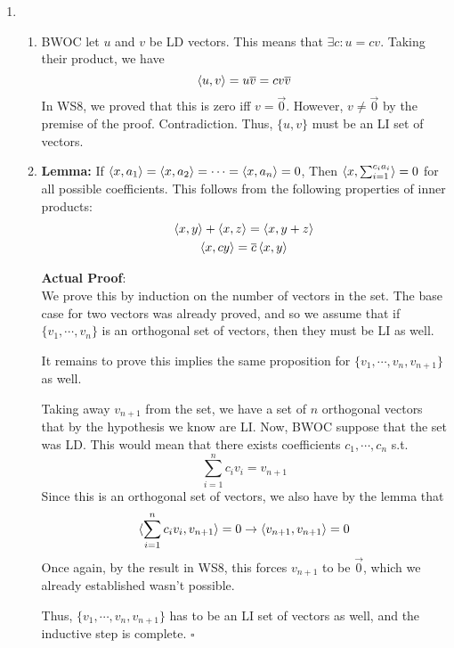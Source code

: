 \documentclass[12pt]{article}
\begin{document}
\begin{enumerate}
            \pagebreak

      \item \begin{enumerate}
                  \item BWOC let $u$ and $v$ be LD vectors.
                        This means that $\exists c: u=cv$.
                        Taking their product, we have
                        \[\braket{u, v} = u\overline{v} = cv\overline{v}\]
                        In WS8, we proved that this is zero iff $v=\vec{0}$.
                        However, $v \ne \vec{0}$ by the premise of the proof.
                        Contradiction.
                        Thus, $\{u, v\}$ must be an LI set of vectors.
                  \item \textbf{Lemma:} If $\braket{x, a_1}=\braket{x, a_2}=\cdots =\braket{x, a_n}=0$,
                        Then $\braket{x, \sum_{i=1}^{c_i a_i}}=0$ for all possible coefficients.
                        This follows from the following properties of inner products:
                        \begin{gather*}
                              \braket{x, y}+\braket{x, z}=\braket{x,y+z} \\
                              \braket{x, cy}=\overline{c}\braket{x, y}
                        \end{gather*}

                        \textbf{Actual Proof}: \\
                        We prove this by induction on the number of vectors in the set.
                        The base case for two vectors was already proved, and so we assume
                        that if $\{v_1, \cdots, v_n\}$ is an orthogonal set of vectors, then they must be LI as well.

                        It remains to prove this implies the same proposition
                        for $\{v_1, \cdots, v_n, v_{n+1}\}$ as well.

                        Taking away $v_{n+1}$ from the set, we have a set of $n$ orthogonal vectors
                        that by the hypothesis we know are LI.
                        Now, BWOC suppose that the set was LD.
                        This would mean that there exists coefficients $c_1, \cdots, c_n$ s.t.
                        \[\sum_{i=1}^{n} c_i v_i = v_{n+1}\]
                        Since this is an orthogonal set of vectors, we also have by the lemma that
                        \[\braket{\sum_{i=1}^{n} c_i v_i, v_{n+1}}=0 \rightarrow \braket{v_{n+1}, v_{n+1}}=0\]
                        Once again, by the result in WS8, this forces $v_{n+1}$ to be $\vec{0}$,
                        which we already established wasn't possible.

                        Thus, $\{v_1, \cdots, v_n, v_{n+1}\}$ has to be an LI set of vectors as well,
                        and the inductive step is complete. $\square$
            \end{enumerate}
\end{enumerate}
\end{document}
